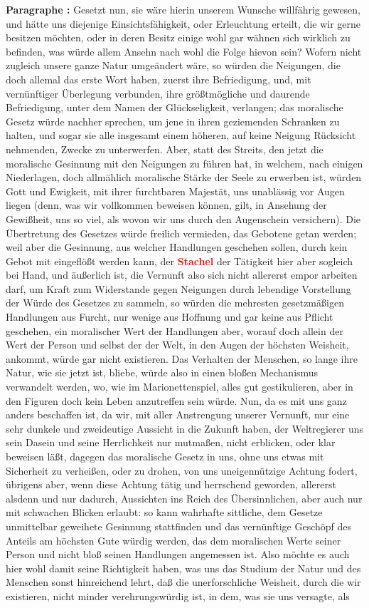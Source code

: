 \documentclass[a4paper,12pt,twoside]{book}
\newcommand{\match}[1]{\textcolor{red}{\textbf{#1}}}
\begin{document}
	\noindent\textbf{Paragraphe : }Gesetzt nun, sie wäre hierin unserem Wunsche willfährig gewesen, und hätte uns diejenige Einsichtsfähigkeit, oder Erleuchtung erteilt, die wir gerne besitzen möchten, oder in deren Besitz einige wohl gar wähnen sich wirklich zu befinden, was würde allem Ansehn nach wohl die Folge hievon sein? Wofern nicht zugleich unsere ganze Natur umgeändert wäre, so würden die Neigungen, die doch allemal das erste Wort haben, zuerst ihre Befriedigung, und, mit vernünftiger Überlegung verbunden, ihre größtmögliche und daurende Befriedigung, unter dem Namen der Glückseligkeit, verlangen; das moralische Gesetz würde nachher sprechen, um jene in ihren geziemenden Schranken zu halten, und sogar sie alle insgesamt einem höheren, auf keine Neigung Rücksicht nehmenden, Zwecke zu unterwerfen.  Aber, statt des Streits, den jetzt die moralische Gesinnung mit den Neigungen zu führen hat, in welchem, nach einigen Niederlagen, doch allmählich moralische Stärke der Seele zu erwerben ist, würden Gott und Ewigkeit, mit ihrer furchtbaren Majestät, uns unablässig vor Augen liegen (denn, was wir vollkommen beweisen können, gilt, in Ansehung der Gewißheit, uns so viel, als wovon wir uns durch den Augenschein versichern). Die Übertretung des Gesetzes würde freilich vermieden, das Gebotene getan werden; weil aber die Gesinnung, aus welcher Handlungen geschehen sollen, durch kein Gebot mit eingeflößt werden kann, der \match{Stachel} der Tätigkeit hier aber sogleich bei Hand, und äußerlich ist, die Vernunft also sich nicht allererst empor arbeiten darf, um Kraft zum Widerstande gegen Neigungen durch lebendige Vorstellung der Würde des Gesetzes zu sammeln, so würden die mehresten gesetzmäßigen Handlungen aus Furcht, nur wenige aus Hoffnung und gar keine aus Pflicht geschehen, ein moralischer Wert der Handlungen aber, worauf doch allein der Wert der Person und selbst der der Welt, in den Augen der höchsten Weisheit, ankommt, würde gar nicht existieren. Das Verhalten der Menschen, so lange ihre Natur, wie sie jetzt ist, bliebe, würde also in einen bloßen Mechanismus verwandelt werden, wo, wie im Marionettenspiel, alles gut gestikulieren, aber in den Figuren doch kein Leben anzutreffen sein würde. Nun, da es mit uns ganz anders beschaffen ist, da wir, mit aller Anstrengung unserer Vernunft, nur eine sehr dunkele und zweideutige Aussicht in die Zukunft haben, der Weltregierer uns sein Dasein und seine Herrlichkeit nur mutmaßen, nicht erblicken, oder klar beweisen läßt, dagegen das moralische Gesetz in uns, ohne uns etwas mit Sicherheit zu verheißen, oder zu drohen, von uns uneigennützige Achtung fodert, übrigens aber, wenn diese Achtung tätig und herrschend geworden, allererst alsdenn und nur dadurch, Aussichten ins Reich des Übersinnlichen, aber auch nur mit schwachen Blicken erlaubt: so kann wahrhafte sittliche, dem Gesetze unmittelbar geweihete Gesinnung stattfinden und das vernünftige Geschöpf des Anteils am höchsten Gute würdig  werden, das dem moralischen Werte seiner Person und nicht bloß seinen Handlungen angemessen ist. Also möchte es auch hier wohl damit seine Richtigkeit haben, was uns das Studium der Natur und des Menschen sonst hinreichend lehrt, daß die unerforschliche Weisheit, durch die wir existieren, nicht minder verehrungswürdig ist, in dem, was sie uns versagte, als 
\end{document}
